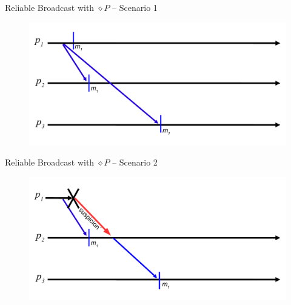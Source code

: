 \begin{frame}{Reliable Broadcast with $\diamond P$ -- Scenario 1}
	
\begin{figure}
\includegraphics[width=\textwidth]{rb-diamond1}
\end{figure}
	
\end{frame}

\begin{frame}{Reliable Broadcast with $\diamond P$ -- Scenario 2}
	
\begin{figure}
\includegraphics[width=\textwidth]{rb-diamond2}
\end{figure}

\end{frame}
	
